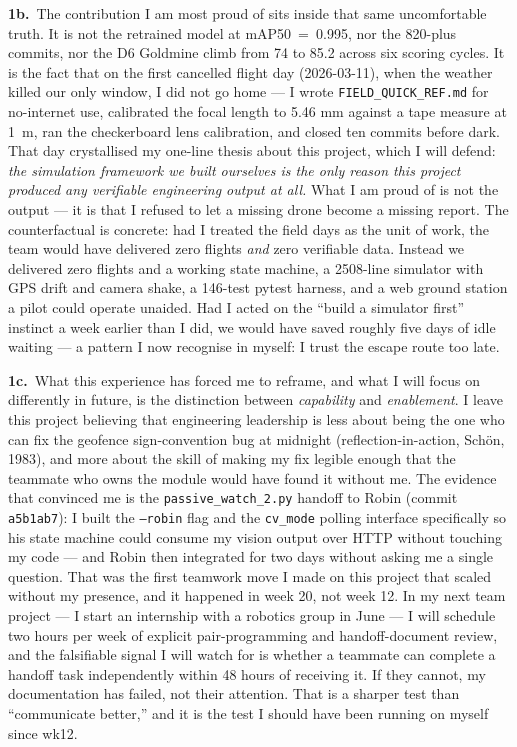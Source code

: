 \textbf{1b.}~The contribution I am most proud of sits inside that same uncomfortable truth. It is not the retrained model at mAP50~=~0.995, nor the 820-plus commits, nor the D6 Goldmine climb from 74 to 85.2 across six scoring cycles. It is the fact that on the first cancelled flight day (2026-03-11), when the weather killed our only window, I did not go home --- I wrote \texttt{FIELD\_QUICK\_REF.md} for no-internet use, calibrated the focal length to 5.46 mm against a tape measure at 1~m, ran the checkerboard lens calibration, and closed ten commits before dark. That day crystallised my one-line thesis about this project, which I will defend: \emph{the simulation framework we built ourselves is the only reason this project produced any verifiable engineering output at all.} What I am proud of is not the output --- it is that I refused to let a missing drone become a missing report. The counterfactual is concrete: had I treated the field days as the unit of work, the team would have delivered zero flights \emph{and} zero verifiable data. Instead we delivered zero flights and a working state machine, a 2508-line simulator with GPS drift and camera shake, a 146-test pytest harness, and a web ground station a pilot could operate unaided. Had I acted on the ``build a simulator first'' instinct a week earlier than I did, we would have saved roughly five days of idle waiting --- a pattern I now recognise in myself: I trust the escape route too late.

\textbf{1c.}~What this experience has forced me to reframe, and what I will focus on differently in future, is the distinction between \emph{capability} and \emph{enablement}. I leave this project believing that engineering leadership is less about being the one who can fix the geofence sign-convention bug at midnight (reflection-in-action, Sch\"on, 1983), and more about the skill of making my fix legible enough that the teammate who owns the module would have found it without me. The evidence that convinced me is the \texttt{passive\_watch\_2.py} handoff to Robin (commit \texttt{a5b1ab7}): I built the \texttt{--robin} flag and the \texttt{cv\_mode} polling interface specifically so his state machine could consume my vision output over HTTP without touching my code --- and Robin then integrated for two days without asking me a single question. That was the first teamwork move I made on this project that scaled without my presence, and it happened in week 20, not week 12. In my next team project --- I start an internship with a robotics group in June --- I will schedule two hours per week of explicit pair-programming and handoff-document review, and the falsifiable signal I will watch for is whether a teammate can complete a handoff task independently within 48 hours of receiving it. If they cannot, my documentation has failed, not their attention. That is a sharper test than ``communicate better,'' and it is the test I should have been running on myself since wk12.
